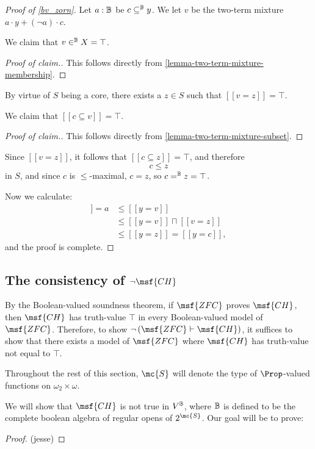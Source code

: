 \documentclass[11pt]{article}
\newcommand{\ZFC}{\msf{ZFC}}
\newcommand{\CH}{\msf{CH}}
\begin{document}
\begin{proof}[Proof of \ref{bv_zorn}]
Let $a : \mathbb{B}$ be $c \subseteq^{\mathbb{B}} y$. We let $v$ be the two-term mixture $a \cdot y + (\neg a) \cdot c$.

We claim that $v \in^{\mathbb{B}} X = \top$.
\begin{proof}[Proof of claim.]
This follows directly from \ref{lemma-two-term-mixture-membership}.
\end{proof}

By virtue of $S$ being a core, there exists a $z \in S$ such that $[[v = z]] = \top$.

We claim that $[[c \subseteq v]] = \top$.
\begin{proof}[Proof of claim.]
This follows directly from \ref{lemma-two-term-mixture-subset}.
\end{proof}

Since $[[v = z]]$, it follows that $[[c \subseteq z]] = \top$, and therefore
$$
c \leq z
$$
in $S$, and since $c$ is $\leq$-maximal, $c = z$, so $c =^{\mathbb{B}} z = \top$.

Now we calculate:
\begin{align*}
  [[c \subseteq y]] = a &\leq [[y = v]]\\
                        &\leq [[y = v]] \sqcap [[v = z]]\\
                        &\leq [[y = z]] = [[y = c]],
\end{align*}
and the proof is complete.
\end{proof}

\subsection{The consistency of $\neg \CH$}
By the Boolean-valued soundness theorem, if $\ZFC$ proves $\msf{CH}$, then $\msf{CH}$ has truth-value $\top$ in every Boolean-valued model of $\ZFC$. Therefore, to show $\neg \left(\ZFC \vdash \CH\right)$, it suffices to show that there exists a model of $\ZFC$ where $\CH$ has truth-value not equal to $\top$.

Throughout the rest of this section, $\mc{S}$ will denote the type of $\Prop$-valued functions on $\omega_2 \times \omega$. %

We will show that $\CH$ is not true in $V^{\mathbb{B}}$, where $\mathbb{B}$ is defined to be the complete boolean algebra of regular opens of $2^{\mc{S}}$. Our goal will be to prove:

\begin{proof}
  (jesse) %
\end{proof}
\end{document}
